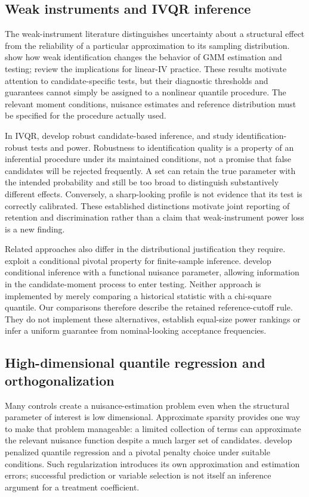 \subsection{Weak instruments and IVQR inference}
The weak-instrument literature distinguishes uncertainty about a structural effect from the reliability of a particular approximation to its sampling distribution. \textcite{stock_wright_2000} show how weak identification changes the behavior of GMM estimation and testing; \textcite{andrews_stock_sun_2019} review the implications for linear-IV practice. These results motivate attention to candidate-specific tests, but their diagnostic thresholds and guarantees cannot simply be assigned to a nonlinear quantile procedure. The relevant moment conditions, nuisance estimates and reference distribution must be specified for the procedure actually used.

In IVQR, \textcite{chernozhukov_hansen_2008} develop robust candidate-based inference, and \textcite{jun_2008} study identification-robust tests and power. Robustness to identification quality is a property of an inferential procedure under its maintained conditions, not a promise that false candidates will be rejected frequently. A set can retain the true parameter with the intended probability and still be too broad to distinguish substantively different effects. Conversely, a sharp-looking profile is not evidence that its test is correctly calibrated. These established distinctions motivate joint reporting of retention and discrimination rather than a claim that weak-instrument power loss is a new finding.

Related approaches also differ in the distributional justification they require. \textcite{chernozhukov_hansen_jansson_2009} exploit a conditional pivotal property for finite-sample inference. \textcite{andrews_mikusheva_2016} develop conditional inference with a functional nuisance parameter, allowing information in the candidate-moment process to enter testing. Neither approach is implemented by merely comparing a historical statistic with a chi-square quantile. Our comparisons therefore describe the retained reference-cutoff rule. They do not implement these alternatives, establish equal-size power rankings or infer a uniform guarantee from nominal-looking acceptance frequencies.

\subsection{High-dimensional quantile regression and orthogonalization}
Many controls create a nuisance-estimation problem even when the structural parameter of interest is low dimensional. Approximate sparsity provides one way to make that problem manageable: a limited collection of terms can approximate the relevant nuisance function despite a much larger set of candidates. \textcite{belloni_chernozhukov_2011} develop penalized quantile regression and a pivotal penalty choice under suitable conditions. Such regularization introduces its own approximation and estimation errors; successful prediction or variable selection is not itself an inference argument for a treatment coefficient.


